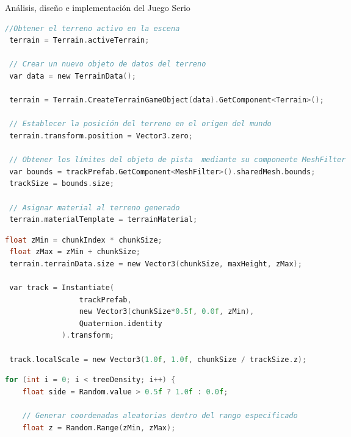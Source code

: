 \begin{thesischapter}{2} {Análisis, diseño e implementación del Juego Serio}
\begin{center}
\begin{minipage}{0.8\textwidth}
\begin{lstlisting}[language=c, caption={Generar terreno},label={hola}]
 //Obtener el terreno activo en la escena
 terrain = Terrain.activeTerrain;
 
 // Crear un nuevo objeto de datos del terreno
 var data = new TerrainData();

 terrain = Terrain.CreateTerrainGameObject(data).GetComponent<Terrain>();
 
 // Establecer la posición del terreno en el origen del mundo
 terrain.transform.position = Vector3.zero;     

 // Obtener los límites del objeto de pista  mediante su componente MeshFilter           
 var bounds = trackPrefab.GetComponent<MeshFilter>().sharedMesh.bounds;
 trackSize = bounds.size;
 
 // Asignar material al terreno generado
 terrain.materialTemplate = terrainMaterial;
\end{lstlisting}
\end{minipage}  
\end{center}

\begin{center}
\begin{minipage}{0.8\textwidth}
\begin{lstlisting}[language=c, caption={Generar pista}]
 float zMin = chunkIndex * chunkSize;
 float zMax = zMin + chunkSize;
 terrain.terrainData.size = new Vector3(chunkSize, maxHeight, zMax);

 var track = Instantiate(
                 trackPrefab, 
                 new Vector3(chunkSize*0.5f, 0.0f, zMin), 
                 Quaternion.identity
             ).transform;

 track.localScale = new Vector3(1.0f, 1.0f, chunkSize / trackSize.z);
\end{lstlisting}
\end{minipage}  
\end{center}

\begin{center}
\begin{minipage}{0.8\textwidth}
\begin{lstlisting}[language=c, caption={Posicionar árboles}]    
 for (int i = 0; i < treeDensity; i++) {
    float side = Random.value > 0.5f ? 1.0f : 0.0f;

    // Generar coordenadas aleatorias dentro del rango especificado
    float z = Random.Range(zMin, zMax);  


\end{lstlisting}
\end{minipage}
\end{center}
\end{thesischapter}
